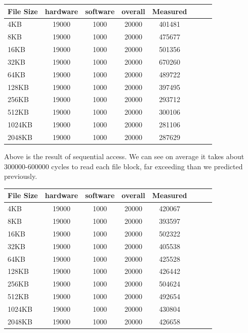 \begin{center}
\begin{tabular}{l*{6}{c}r}
File Size             &  hardware & software & overall & Measured \\
\hline
4KB & 19000 & 1000 & 20000 & 401481\\ 
8KB & 19000 & 1000 & 20000 & 475677\\ 
16KB & 19000 & 1000 & 20000 & 501356\\
32KB & 19000 & 1000 & 20000 & 670260\\
64KB & 19000 & 1000 & 20000 & 489722\\
128KB & 19000 & 1000 & 20000 & 397495\\
256KB & 19000 & 1000 & 20000 & 293712\\
512KB & 19000 & 1000 & 20000 & 300106\\
1024KB & 19000 & 1000 & 20000 & 281106\\
2048KB & 19000 & 1000 & 20000 & 287629\\

\end{tabular}
\end{center}

Above is the result of sequential access. We can see on average it takes about 300000-600000 cycles to read each file block, far exceeding than we predicted previously.

\begin{center}
\begin{tabular}{l*{6}{c}r}
File Size             &  hardware & software & overall & Measured \\
\hline
4KB & 19000 & 1000 & 20000 & 420067\\ 
8KB & 19000 & 1000 & 20000 & 393597\\ 
16KB & 19000 & 1000 & 20000 & 502322\\
32KB & 19000 & 1000 & 20000 & 405538\\
64KB & 19000 & 1000 & 20000 & 425528\\
128KB & 19000 & 1000 & 20000 & 426442\\
256KB & 19000 & 1000 & 20000 & 504624\\
512KB & 19000 & 1000 & 20000 & 492654\\
1024KB & 19000 & 1000 & 20000 & 430804\\
2048KB & 19000 & 1000 & 20000 & 426658\\

\end{tabular}
\end{center}

